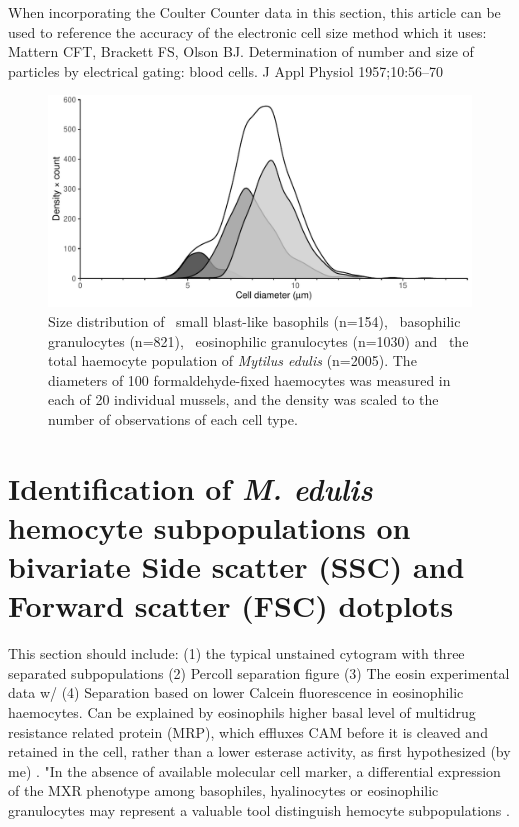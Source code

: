 When incorporating the Coulter Counter data in this section, this article can be used to reference the accuracy of the electronic cell size method which it uses: Mattern CFT, Brackett FS, Olson BJ. Determination of number and size of particles by electrical gating: blood cells. J Appl Physiol 1957;10:56–70

\begin{figure}[!ht]
    \centering
    \includegraphics[width=1.0\textwidth]{figures/Anatomy/diameters scaled density plot.pdf}
    \caption{Size distribution of \protect\dimgraybox \ small blast-like basophils (n=154), \protect\lightgraybox \ basophilic granulocytes (n=821), \protect\lysegraabox \ eosinophilic granulocytes (n=1030) and \protect\whitebox \ the total haemocyte population of \emph{Mytilus edulis} (n=2005). The diameters of 100 formaldehyde-fixed haemocytes was measured in each of 20 individual mussels, and the density was scaled to the number of observations of each cell type.}
    \label{fig:Diameters}
\end{figure}


\section{Identification of \emph{M. edulis} hemocyte subpopulations on bivariate Side scatter (SSC) and Forward scatter (FSC) dotplots}
This section should include:
(1) the typical unstained cytogram with three separated subpopulations
(2) Percoll separation figure
(3) The eosin experimental data w/ 
(4) Separation based on lower Calcein fluorescence in eosinophilic haemocytes. Can be explained by eosinophils higher basal level of multidrug resistance related protein (MRP), which effluxes CAM before it is cleaved and retained in the cell, rather than a lower esterase activity, as first hypothesized (by me) \cite{Rioult2014}. "In the absence of available molecular cell marker, a differential expression of the MXR phenotype among basophiles,
hyalinocytes or eosinophilic granulocytes may represent a valuable tool distinguish hemocyte subpopulations \cite{Rioult2014}.

